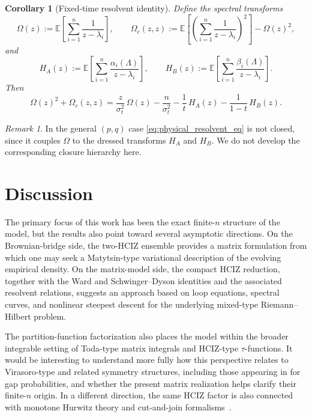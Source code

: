 \documentclass[11pt,a4paper]{article}
\newtheorem{corollary}[theorem]{Corollary}
\theoremstyle{definition}\newtheorem{definition}[theorem]{Definition}
\theoremstyle{remark}\newtheorem{remark}[theorem]{Remark}
\numberwithin{equation}{section}
\newcommand{\EE}{\mathbb{E}}
\begin{document}
\begin{corollary}[Fixed-time resolvent identity]
\label{cor:physical_resolvent_SD}
Define the spectral transforms
\begin{equation} 
\Omega(z):=\EE\!\left[\sum_{i=1}^n\frac{1}{z-\lambda_i}\right],
\qquad
\Omega_c(z,z):=
\EE\!\left[\left(\sum_{i=1}^n\frac{1}{z-\lambda_i}\right)^2\right]
-\Omega(z)^2,
\end{equation}
and
\begin{equation} 
H_A(z):=\EE\!\left[\sum_{i=1}^n\frac{\alpha_i(\Lambda)}{z-\lambda_i}\right],
\qquad
H_B(z):=\EE\!\left[\sum_{i=1}^n\frac{\beta_i(\Lambda)}{z-\lambda_i}\right].
\end{equation}
Then
\begin{equation}\label{eq:physical_resolvent_eq}
\Omega(z)^2+\Omega_c(z,z)
=
\frac{z}{\sigma_t^2}\,\Omega(z)
-\frac{n}{\sigma_t^2}
-\frac1t\,H_A(z)
-\frac1{1-t}\,H_B(z).
\end{equation}
\end{corollary}


 

\begin{remark}
In the general $(p,q)$ case \eqref{eq:physical_resolvent_eq} is not closed, since it couples $\Omega$ to the dressed transforms $H_A$ and $H_B$. We do not develop the corresponding closure hierarchy here.
\end{remark}


 

\section{Discussion}
\label{sec:discussion}

The primary focus of this work has been the exact finite-$n$ structure of the model, but the results also point toward several asymptotic directions. On the Brownian-bridge side, the two-HCIZ ensemble provides a matrix formulation from which one may seek a Matytsin-type variational description of the evolving empirical density. On the matrix-model side, the compact HCIZ reduction, together with the Ward and Schwinger--Dyson identities and the associated resolvent relations, suggests an approach based on loop equations, spectral curves, and nonlinear steepest descent for the underlying mixed-type Riemann--Hilbert problem.

The partition-function factorization also places the model within the broader integrable setting of Toda-type matrix integrals and HCIZ-type $\tau$-functions. It would be interesting to understand more fully how this perspective relates to Virasoro-type and related symmetry structures, including those appearing in \cite{AdlerVanMoerbekeVanderstichelen2012} for gap probabilities, and whether the present matrix realization helps clarify their finite-$n$ origin. In a different direction, the same HCIZ factor is also connected with monotone Hurwitz theory and cut-and-join formalisms~\cite{GouldenGuayPaquetNovak2014}.
\end{document}
